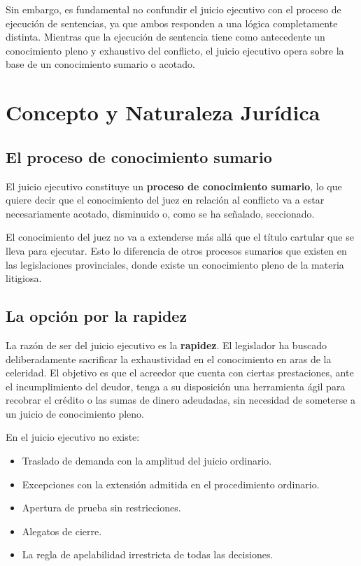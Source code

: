 \documentclass[12pt,oneside]{book}
\begin{document}
Sin embargo, es fundamental no confundir el juicio ejecutivo con el proceso de ejecución de sentencias, ya que ambos responden a una lógica completamente distinta. Mientras que la ejecución de sentencia tiene como antecedente un conocimiento pleno y exhaustivo del conflicto, el juicio ejecutivo opera sobre la base de un conocimiento sumario o acotado.

\section{Concepto y Naturaleza Jurídica}

\subsection{El proceso de conocimiento sumario}

El juicio ejecutivo constituye un \textbf{proceso de conocimiento sumario}, lo que quiere decir que el conocimiento del juez en relación al conflicto va a estar necesariamente acotado, disminuido o, como se ha señalado, seccionado.

El conocimiento del juez no va a extenderse más allá que el título cartular que se lleva para ejecutar. Esto lo diferencia de otros procesos sumarios que existen en las legislaciones provinciales, donde existe un conocimiento pleno de la materia litigiosa.

\subsection{La opción por la rapidez}

La razón de ser del juicio ejecutivo es la \textbf{rapidez}. El legislador ha buscado deliberadamente sacrificar la exhaustividad en el conocimiento en aras de la celeridad. El objetivo es que el acreedor que cuenta con ciertas prestaciones, ante el incumplimiento del deudor, tenga a su disposición una herramienta ágil para recobrar el crédito o las sumas de dinero adeudadas, sin necesidad de someterse a un juicio de conocimiento pleno.

En el juicio ejecutivo no existe:
\begin{itemize}
    \item Traslado de demanda con la amplitud del juicio ordinario.
    \item Excepciones con la extensión admitida en el procedimiento ordinario.
    \item Apertura de prueba sin restricciones.
    \item Alegatos de cierre.
    \item La regla de apelabilidad irrestricta de todas las decisiones.
\end{itemize}
\end{document}
